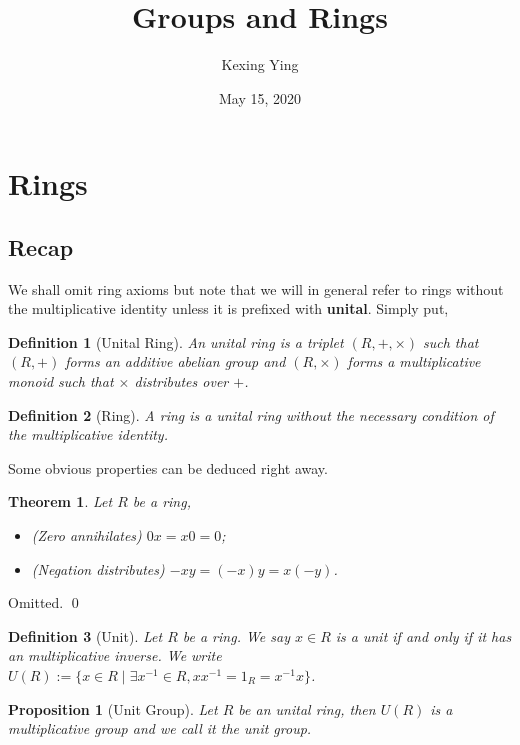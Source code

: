 \documentclass[
]{article}
\title{Groups and Rings}
\author{Kexing Ying}
\date{May 15, 2020}
\newtheorem{theorem}{Theorem}
\newtheorem{definition}{Definition}[theorem]
\newtheorem{proposition}{Proposition}[theorem]
\begin{document}
\maketitle

{
\hypersetup{linkcolor=}
\setcounter{tocdepth}{2}
\tableofcontents
}
\hypertarget{rings}{%
\section{Rings}\label{rings}}

\hypertarget{recap}{%
\subsection{Recap}\label{recap}}

We shall omit ring axioms but note that we will in general refer to
rings without the multiplicative identity unless it is prefixed with
\textbf{unital}. Simply put,

\begin{definition}[Unital Ring]
  An \textit{unital ring} is a triplet \((R, +, \times)\) such that \((R, +)\) 
  forms an additive abelian group and \((R, \times)\) forms a multiplicative 
  monoid such that \(\times\) distributes over \(+\).
\end{definition}
\begin{definition}[Ring]
  A \textit{ring} is a unital ring without the necessary condition of the 
  multiplicative identity. 
\end{definition}

Some obvious properties can be deduced right away.

\begin{theorem}
  Let \(R\) be a ring, 
  \begin{itemize}
    \item (Zero annihilates) \(0 x = x 0 = 0\);
    \item (Negation distributes) \(-xy = (-x)y = x(-y)\).
  \end{itemize}
\end{theorem}
\proof

Omitted. \qed

\begin{definition}[Unit]
  Let \(R\) be a ring. We say \(x \in R\) is a unit if and only if it has an 
  multiplicative inverse. We write 
  \(U(R) := \{x \in R \mid \exists x^{-1} \in R, x x^{-1} = 1_R = x^{-1} x\}\).
\end{definition}

\begin{proposition}[Unit Group]
  Let \(R\) be an unital ring, then \(U(R)\) is a multiplicative group and we 
  call it the \textit{unit group}.
\end{proposition}
\end{document}
